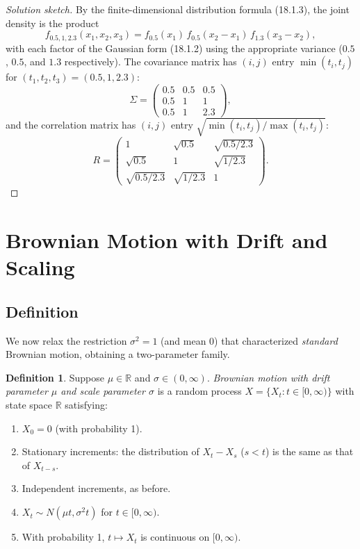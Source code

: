\documentclass[12pt,openany]{book}
\theoremstyle{definition}
\newtheorem{definition}[theorem]{Definition}
\theoremstyle{remark}
\newcommand{\R}{\mathbb{R}}
\begin{document}
\begin{proof}[Solution sketch]
By the finite-dimensional distribution formula (18.1.3), the joint density is the product
\[
    f_{0.5,1,2.3}(x_1,x_2,x_3) = f_{0.5}(x_1)\,f_{0.5}(x_2-x_1)\,f_{1.3}(x_3-x_2),
\]
with each factor of the Gaussian form (18.1.2) using the appropriate variance ($0.5$, $0.5$, and $1.3$ respectively). The covariance matrix has $(i,j)$ entry $\min(t_i,t_j)$ for $(t_1,t_2,t_3) = (0.5,1,2.3)$:
\[
    \Sigma = \begin{pmatrix} 0.5 & 0.5 & 0.5 \\ 0.5 & 1 & 1 \\ 0.5 & 1 & 2.3 \end{pmatrix},
\]
and the correlation matrix has $(i,j)$ entry $\sqrt{\min(t_i,t_j)/\max(t_i,t_j)}$:
\[
    R = \begin{pmatrix} 1 & \sqrt{0.5} & \sqrt{0.5/2.3} \\ \sqrt{0.5} & 1 & \sqrt{1/2.3} \\ \sqrt{0.5/2.3} & \sqrt{1/2.3} & 1 \end{pmatrix}.
\]
\end{proof}
 
\newpage
\section{Brownian Motion with Drift and Scaling}
\label{sec:drift-scaling}
 
\subsection{Definition}
 
We now relax the restriction $\sigma^2=1$ (and mean $0$) that characterized \emph{standard} Brownian motion, obtaining a two-parameter family.
 
\begin{definition}
Suppose $\mu \in \R$ and $\sigma \in (0,\infty)$. \emph{Brownian motion with drift parameter $\mu$ and scale parameter $\sigma$} is a random process $X=\{X_t : t\in[0,\infty)\}$ with state space $\R$ satisfying:
\begin{enumerate}[label=(\arabic*)]
    \item $X_0 = 0$ (with probability 1).
    \item Stationary increments: the distribution of $X_t - X_s$ ($s<t$) is the same as that of $X_{t-s}$.
    \item Independent increments, as before.
    \item $X_t \sim N(\mu t, \sigma^2 t)$ for $t\in[0,\infty)$.
    \item With probability 1, $t \mapsto X_t$ is continuous on $[0,\infty)$.
\end{enumerate}
\end{definition}
 
\end{document}
